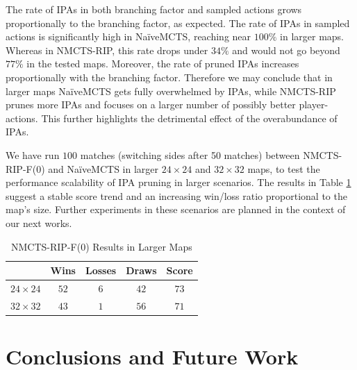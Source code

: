 \documentclass[conference]{IEEEtran}
\begin{document}
The rate of IPAs in both branching factor and sampled actions grows proportionally to the branching factor, as expected. The rate of IPAs in sampled actions is significantly high in NaïveMCTS, reaching near $100\%$ in larger maps. Whereas in NMCTS-RIP, this rate drops under $34\%$ and would not go beyond $77\%$ in the tested maps. Moreover, the rate of pruned IPAs increases proportionally with the branching factor. Therefore we may conclude that in larger maps NaïveMCTS gets fully overwhelmed by IPAs, while NMCTS-RIP prunes more IPAs and focuses on a larger number of possibly better player-actions. This further highlights the detrimental effect of the overabundance of IPAs.

We have run $100$ matches (switching sides after 50 matches) between NMCTS-RIP-F($0$) and NaïveMCTS in larger $24\times24$ and $32\times32$ maps, to test the performance scalability of IPA pruning in larger scenarios. The results in Table \ref{largeMaps} suggest a stable score trend and an increasing win/loss ratio proportional to the map's size. Further experiments in these scenarios are planned in the context of our next works.

\begin{table}[!t]
\caption{NMCTS-RIP-F($0$) Results in Larger Maps}
\label{largeMaps}
\renewcommand{\arraystretch}{1.3}
\centering
\begin{tabular}{c|c|c|c|c} 
\cline{2-5}
\multicolumn{1}{c|}{} & Wins & Losses & Draws & Score  \\ 
\hline \hline
$24\times24$ & $52$ & $6$ & $42$ & $73$ \\
$32\times32$ & $43$ & $1$ & $56$ & $71$ \\
\hline
\end{tabular}
\end{table}


\section{Conclusions and Future Work}
\label{sec:conclusions}
\end{document}
